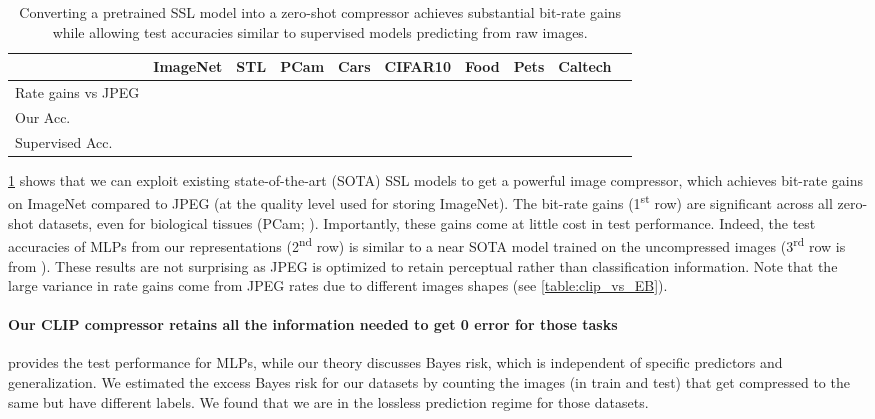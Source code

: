 \documentclass[final]{article}
\begin{document}
\begin{table}[h]
\vspace{-1\baselineskip}
\caption{
Converting a pretrained SSL model into a zero-shot compressor achieves substantial bit-rate gains while allowing test accuracies similar to supervised models predicting from raw images. 
}
\small
\center
\begin{tabular}{lrrrrrrrrr}
\toprule
& ImageNet  & STL & PCam & Cars & CIFAR10 & Food       & Pets & Caltech  \\ \midrule 
Rate gains vs JPEG &    &  &    &   &  &  &  &   \\ \midrule 
Our Acc.  &    &   &  &   &  &   &  &   \\
Supervised Acc.  &    &   &    &  &   &   &  &  \\ 
\bottomrule
\end{tabular}
\label{table:clip}
\end{table} 
\cref{table:clip} shows that we can exploit existing state-of-the-art (SOTA) SSL models to get a powerful image compressor, which achieves  bit-rate gains on ImageNet compared to JPEG (at the quality level used for storing ImageNet).
The bit-rate gains (1\textsuperscript{st} row) are significant across all zero-shot datasets, even for biological tissues (PCam; \cite{veeling_rotation_2018}).
Importantly, these gains come at little cost in test performance.
Indeed, the test accuracies of MLPs from our representations (2\textsuperscript{nd} row) is similar to a near SOTA model trained on the uncompressed images (3\textsuperscript{rd} row is from \citet{radford_learning_2021}).
These results are not surprising as JPEG is optimized to retain perceptual rather than classification information.
Note that the large variance in rate gains come from JPEG rates due to different images shapes (see \cref{table:clip_vs_EB}).

\paragraph{Our CLIP compressor retains all the information needed to get 0 error for those tasks}
 provides the test performance for MLPs, while our theory discusses Bayes risk, which is independent of specific predictors and generalization. 
We estimated the excess Bayes risk for our datasets by counting the images (in train and test) that get compressed to the same  but have different labels. 
We found that we are in the lossless prediction regime for those datasets.
\end{document}
